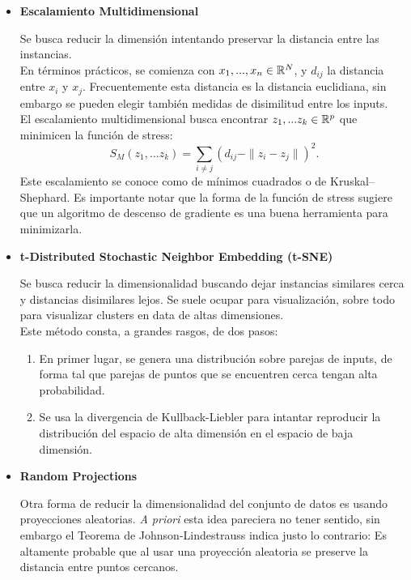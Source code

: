 \begin{itemize}
    \item \textbf{Escalamiento Multidimensional}
    
    Se busca reducir la dimensión intentando preservar la distancia entre las instancias. \\
    
    En términos prácticos, se comienza con  $x_1, ..., x_n \in \mathbb{R}^{N}$, y $d_{ij}$ la distancia entre $x_i$ y $x_j$. Frecuentemente esta distancia es la distancia euclidiana, sin embargo se pueden elegir también medidas de disimilitud entre los inputs. \\
    
    El escalamiento multidimensional busca encontrar $z_1, ... z_k \in \mathbb{R}^p$ que minimicen la función de stress: 
    $$
    S_M(z_1,...z_k) = \sum_{i \not = j} (d_{ij} - \|z_i - z_j\|)^2.
    $$
    Este escalamiento se conoce como de mínimos cuadrados o de Kruskal–Shephard. Es importante notar que la forma de la función de stress sugiere que un algoritmo de descenso de gradiente es una buena herramienta para minimizarla.
    
    \item \textbf{t-Distributed Stochastic Neighbor Embedding (t-SNE)}
    
    Se busca reducir la dimensionalidad buscando dejar instancias similares cerca y distancias disimilares lejos. Se suele ocupar para visualización, sobre todo para visualizar clusters en data de altas dimensiones. \\
    
    Este método consta, a grandes rasgos, de dos pasos: 
    \begin{enumerate}
        \item En primer lugar, se genera una distribución sobre parejas de inputs, de forma tal que parejas de puntos que se encuentren cerca tengan alta probabilidad. 
        \item Se usa la divergencia de Kullback-Liebler para intantar reproducir la distribución del espacio de alta dimensión en el espacio de baja dimensión.
    \end{enumerate}
    
    \item \textbf{Random Projections}
    
    Otra forma de reducir la dimensionalidad del conjunto de datos es usando proyecciones aleatorias. \textit{A priori} esta idea pareciera no tener sentido, sin embargo el Teorema de Johnson-Lindestrauss indica justo lo contrario: Es altamente probable que al usar una proyección aleatoria se preserve la distancia entre puntos cercanos. \\
    

\end{itemize}
